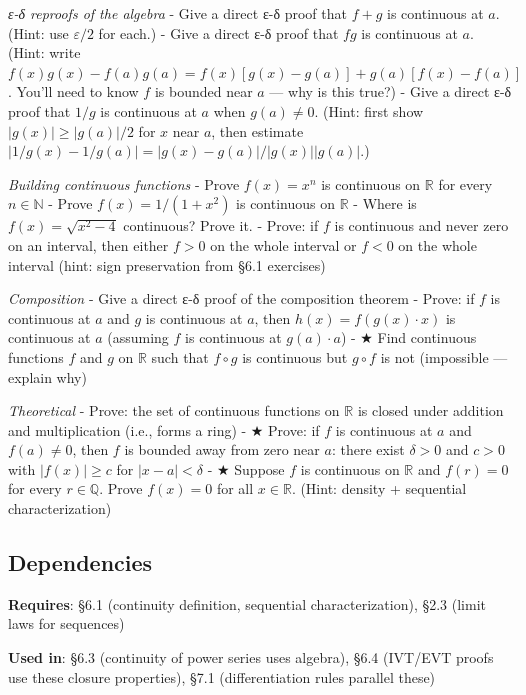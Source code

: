 \documentclass[
  10pt,
  letterpaper,
]{scrbook}
\newcommand{\NN}{\mathbb{N}}
\newcommand{\QQ}{\mathbb{Q}}
\newcommand{\RR}{\mathbb{R}}
\begin{document}
\emph{ε-δ reproofs of the algebra} - Give a direct ε-δ proof that
\(f + g\) is continuous at \(a\). (Hint: use \(\varepsilon/2\) for
each.) - Give a direct ε-δ proof that \(fg\) is continuous at \(a\).
(Hint: write
\(f(x)g(x) - f(a)g(a) = f(x)[g(x) - g(a)] + g(a)[f(x) - f(a)]\). You'll
need to know \(f\) is bounded near \(a\) --- why is this true?) - Give a
direct ε-δ proof that \(1/g\) is continuous at \(a\) when
\(g(a) \neq 0\). (Hint: first show \(|g(x)| \geq |g(a)|/2\) for \(x\)
near \(a\), then estimate
\(|1/g(x) - 1/g(a)| = |g(x) - g(a)| / |g(x)||g(a)|\).)

\emph{Building continuous functions} - Prove \(f(x) = x^n\) is
continuous on \(\RR\) for every \(n \in \NN\) - Prove
\(f(x) = 1/(1 + x^2)\) is continuous on \(\RR\) - Where is
\(f(x) = \sqrt{x^2 - 4}\) continuous? Prove it. - Prove: if \(f\) is
continuous and never zero on an interval, then either \(f > 0\) on the
whole interval or \(f < 0\) on the whole interval (hint: sign
preservation from §6.1 exercises)

\emph{Composition} - Give a direct ε-δ proof of the composition theorem
- Prove: if \(f\) is continuous at \(a\) and \(g\) is continuous at
\(a\), then \(h(x) = f(g(x) \cdot x)\) is continuous at \(a\) (assuming
\(f\) is continuous at \(g(a) \cdot a\)) - ★ Find continuous functions
\(f\) and \(g\) on \(\RR\) such that \(f \circ g\) is continuous but
\(g \circ f\) is not (impossible --- explain why)

\emph{Theoretical} - Prove: the set of continuous functions on \(\RR\)
is closed under addition and multiplication (i.e., forms a ring) - ★
Prove: if \(f\) is continuous at \(a\) and \(f(a) \neq 0\), then \(f\)
is bounded away from zero near \(a\): there exist \(\delta > 0\) and
\(c > 0\) with \(|f(x)| \geq c\) for \(|x - a| < \delta\) - ★ Suppose
\(f\) is continuous on \(\RR\) and \(f(r) = 0\) for every \(r \in \QQ\).
Prove \(f(x) = 0\) for all \(x \in \RR\). (Hint: density + sequential
characterization)

\subsection{Dependencies}\label{dependencies-25}

\textbf{Requires}: §6.1 (continuity definition, sequential
characterization), §2.3 (limit laws for sequences)

\textbf{Used in}: §6.3 (continuity of power series uses algebra), §6.4
(IVT/EVT proofs use these closure properties), §7.1 (differentiation
rules parallel these)
\end{document}
